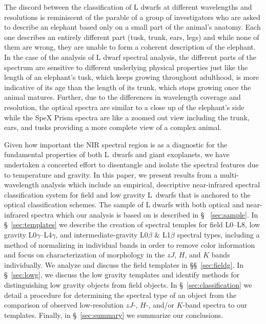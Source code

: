 \documentclass[12pt]{aastex6}
\begin{document}
The discord between the classification of L dwarfs at different wavelengths and resolutions is reminiscent of the parable of a group of investigators who are asked to describe an elephant based only on a small part of the animal's anatomy.
Each one describes an entirely different part (tusk, trunk, ears, legs) and while none of them are wrong, they are unable to form a coherent description of the elephant.
In the case of the analysis of L dwarf spectral analysis, the different parts of the spectrum are sensitive to different underlying physical properties just like the length of an elephant's tusk, which keeps growing throughout adulthood, is more indicative of its age than the length of its trunk, which stops growing once the animal matures.
Further, due to the differences in wavelength coverage and resolution, the optical spectra are similar to a close up of the elephant's side while the SpeX Prism spectra are like a zoomed out view including the trunk, ears, and tusks providing a more complete view of a complex animal.

Given how important the NIR spectral region is as a diagnostic for the fundamental properties of both L~dwarfs and giant exoplanets, we have undertaken a concerted effort to disentangle and isolate the spectral features due to temperature and gravity.
In this paper, we present results from a multi-wavelength analysis which include an empirical, descriptive near-infrared spectral classification system for field and low gravity L~dwarfs that is anchored to the optical classification schemes.
The sample of L dwarfs with both optical and near-infrared spectra which our analysis is based on is described in \S~ \ref{sec:sample}.
In \S~\ref{sec:templates} we describe the creation of spectral temples for field L0--L8, low gravity L0$\gamma$--L4$\gamma$, and intermediate-gravity L0$\beta$ \& L1$\beta$ spectral types, including a method of normalizing in individual bands in order to remove color information and focus on characterization of morphology in the $zJ$, $H$, and $K$ bands individually.
We analyze and discuss the field templates in \S\S~\ref{sec:fieldg}.
In \S~\ref{sec:lowg}, we discuss the low gravity templates and identify methods for distinguishing low gravity objects from field objects.
In \S~\ref{sec:classification} we detail a procedure for determining the spectral type of an object from the comparison of observed low-resolution $zJ$-, $H$-, and/or $K$-band spectra to our templates.
Finally, in \S~\ref{sec:summary} we summarize our conclusions.
\end{document}
